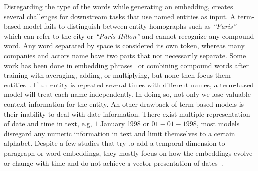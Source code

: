 Disregarding the type of the words while generating an embedding, creates several challenges for downstream tasks that use named entities as input. A term-based model fails to distinguish between entity homographs such as  \emph{``Paris''}  which can refer to the city or \emph{``Paris Hilton''} and cannot recognize any compound word. Any word separated by space is considered its own token, whereas many companies and actors name have two parts that not necessarily separate.  Some work has been done in embedding phrases~ or combining compound words after training with averaging, adding, or multiplying, but none then focus them entities~. If an entity is repeated several times with different names, a term-based model will treat each name independently. In doing so, not only we lose valuable context information for the entity. An other drawback of term-based models is their inability to deal with date information. There exist multiple representation of date and time in text, e.g, $1$ January 1998 or $01-01-1998$, most models disregard any numeric information in text and limit themselves to a certain alphabet. Despite a few studies that try to add a temporal dimension to paragraph or word embeddings, they mostly focus on how the embeddings evolve or change with time and do not achieve a vector presentation of dates~.  \\
